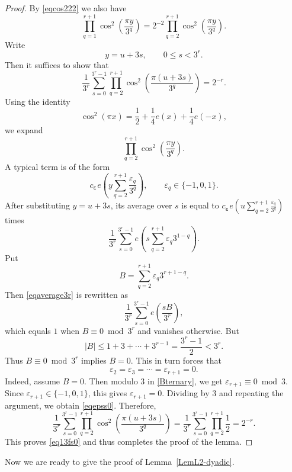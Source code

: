 \documentclass[amssymb,amsfonts,refcheck,12pt,verbatim,righttag]{amsart}
\numberwithin{equation}{section} %
\theoremstyle{plain}
\begin{document}
\begin{proof}
By \eqref{eqcos222} we also have 
\[\prod_{q=1}^{r+1}
\cos^2\left(\frac{\pi y}{3^q}\right)=2^{-2}\prod_{q=2}^{r+1}
\cos^2\left(\frac{\pi y}{3^q}\right).\]
Write
	\[
	y=u+3s,
	\qquad 0\leq s<3^r.
	\]
Then it suffices to show that  
\begin{equation}\label{eq13fs0}
\frac{1}{3^r}
\sum_{s=0}^{3^r-1}
\prod_{q=2}^{r+1}
\cos^2\left(\frac{\pi (u+3s)}{3^q}\right)
=2^{-r}.
\end{equation}
Using the identity 
\begin{equation*}
		\cos^2(\pi x)=\frac12+\frac14 e(x)+\frac14 e(-x),
\end{equation*}
	we expand
	\[
	\prod_{q=2}^{r+1}
	\cos^2\left(\frac{\pi y}{3^q}\right).\]
	A typical term is of the form
	\[
	c_{\boldsymbol\varepsilon}
	e\left(y\sum_{q=2}^{r+1}\frac{\varepsilon_q}{3^q}\right),
	\qquad
	\varepsilon_q\in\{-1,0,1\}.
	\]
After substituting \(y=u+3s\), its average over \(s\) is equal to $	c_{\boldsymbol\varepsilon}e\left(u\sum_{q=2}^{r+1}\frac{\varepsilon_q}{3^q}\right)$ times 
\begin{equation}\label{eqaverage3r}
\frac{1}{3^r}\sum_{s=0}^{3^r-1}
e\left(s\sum_{q=2}^{r+1}\varepsilon_q 3^{1-q}\right).
\end{equation}
Put
\begin{equation}\label{Bternary}
B=\sum_{q=2}^{r+1}\varepsilon_q 3^{r+1-q}.
\end{equation}
Then \eqref{eqaverage3r} is rewritten as 
	\[
	\frac{1}{3^r}\sum_{s=0}^{3^r-1} e\left(\frac{sB}{3^r}\right),
	\]
	which equals $1$ when $B\equiv 0\bmod {3^r}$ and vanishes  otherwise.  But
	\[
	|B|\leq 1+3+\cdots+3^{r-1}=\frac{3^r-1}{2}<3^r.
	\]
	Thus $B\equiv 0\bmod {3^r}$ implies $B=0$. This in turn forces that
\begin{equation}\label{eqepss0}
\varepsilon_2=\varepsilon_3=\cdots=\varepsilon_{r+1}=0.
\end{equation}
Indeed, assume $B=0$. Then modulo \(3\) in \eqref{Bternary}, we get
\(\varepsilon_{r+1}\equiv 0\bmod 3\). Since
\(\varepsilon_{r+1}\in\{-1,0,1\}\), this gives
\(\varepsilon_{r+1}=0\). Dividing by \(3\) and repeating the argument,
we obtain \eqref{eqepss0}. 
Therefore, 
\[\frac{1}{3^r}
\sum_{s=0}^{3^r-1}
\prod_{q=2}^{r+1}
\cos^2\left(\frac{\pi (u+3s)}{3^q}\right)
=\frac{1}{3^r}
\sum_{s=0}^{3^r-1}
\prod_{q=2}^{r+1}\frac{1}{2}=2^{-r}.\]
This proves \eqref{eq13fs0} and thus completes the proof of the lemma. 
\end{proof}

Now we are ready to give the proof of Lemma~\ref{LemL2-dyadic}.
\end{document}
